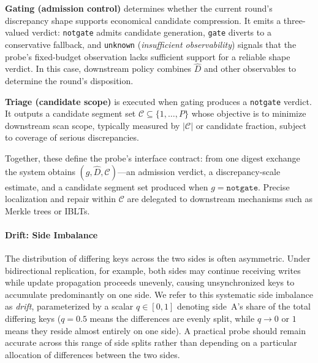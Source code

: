 \textbf{Gating (admission control)} determines whether the current round's discrepancy shape supports economical candidate compression. It emits a three-valued verdict: \texttt{notgate} admits candidate generation, \texttt{gate} diverts to a conservative fallback, and 
\texttt{unknown} (\emph{insufficient observability}) signals that the probe's fixed-budget observation lacks sufficient support for a reliable shape verdict. In this case, downstream policy combines $\hat{D}$ and other observables to determine the round's disposition.

\textbf{Triage (candidate scope)} is executed when gating
produces a \texttt{notgate} verdict. It outputs a candidate
segment set $\mathcal{C}\subseteq \{1,\ldots,P\}$ whose objective
is to minimize downstream scan scope, typically measured by
$|\mathcal{C}|$ or candidate fraction, subject to coverage of
serious discrepancies.

Together, these define the probe's interface contract: from one
digest exchange the system obtains $(g,\hat{D},\mathcal{C})$---an
admission verdict, a discrepancy-scale estimate, and a candidate
segment set produced when $g=\texttt{notgate}$. Precise
localization and repair within $\mathcal{C}$ are delegated to
downstream mechanisms such as Merkle trees or IBLTs.

\paragraph{Drift: Side Imbalance}
\label{sec:problem-drift}
The distribution of differing keys across the two sides is often
asymmetric. Under bidirectional replication, for example, both sides
may continue receiving writes while update propagation proceeds
unevenly, causing unsynchronized keys to accumulate predominantly on
one side. We refer to this systematic side imbalance as \textit{drift},
parameterized by a scalar $q\in[0,1]$ denoting side~A's share of the
total differing keys ($q=0.5$ means the differences are evenly split,
while $q\to 0$ or $1$ means they reside almost entirely on one side).
A practical probe should remain accurate across this range of
side splits rather than depending on a particular allocation of differences
between the two sides.
